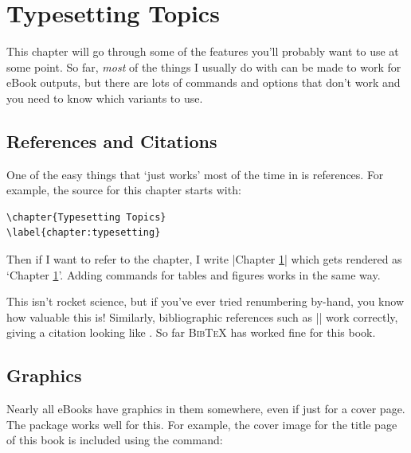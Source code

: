 \chapter{Typesetting Topics}
\label{chapter:typesetting}

This chapter will go through some of the \tex features you'll probably want to use at some point.
So far, {\em most} of the things I usually do with \tex can be made to work for eBook outputs,
but there are lots of commands and options that don't work and you need to know which
variants to use.

\section{References and Citations}

One of the easy things that `just works' most of the time in \latex is references. For example,
the \tex source for this chapter starts with:

\begin{Verbatim}[fontsize=\small]
\chapter{Typesetting Topics}
\label{chapter:typesetting}
\end{Verbatim}

Then if I want to refer to the chapter, I write \sverb|Chapter \ref{chapter:typesetting}| which
gets rendered as `Chapter \ref{chapter:typesetting}'. Adding  commands for tables and figures
works in the same way.

This isn't rocket science, but if you've ever tried
renumbering by-hand, you know how valuable this is! Similarly, bibliographic references such as
\sverb|\cite{knuth1984texbook}| work correctly, giving a citation looking like \cite{knuth1984texbook}.
So far \textsc{BibTeX} has worked fine for this book.

\section{Graphics}

Nearly all eBooks have graphics in them somewhere, even if just for a cover page. 
The  package works well for this.
For example, the cover image for the title page of this book is included using the command:


